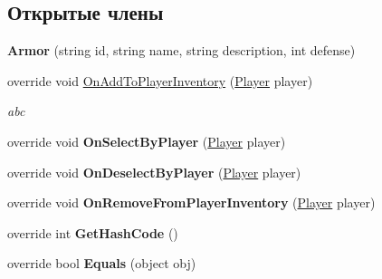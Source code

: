 \subsection*{Открытые члены}
\begin{DoxyCompactItemize}
\item 
\hypertarget{class_a_s_c_i_i_wars_1_1_game_1_1_armor_a3286b25da22682e4773667888ee99cf9}{}\label{class_a_s_c_i_i_wars_1_1_game_1_1_armor_a3286b25da22682e4773667888ee99cf9} 
{\bfseries Armor} (string id, string name, string description, int defense)
\item 
\hypertarget{class_a_s_c_i_i_wars_1_1_game_1_1_armor_ab8e1364e91ddd19f7c214f051b054cd8}{}\label{class_a_s_c_i_i_wars_1_1_game_1_1_armor_ab8e1364e91ddd19f7c214f051b054cd8} 
override void \hyperlink{class_a_s_c_i_i_wars_1_1_game_1_1_armor_ab8e1364e91ddd19f7c214f051b054cd8}{On\+Add\+To\+Player\+Inventory} (\hyperlink{class_a_s_c_i_i_wars_1_1_game_1_1_player}{Player} player)
\begin{DoxyCompactList}\small\item\em abc \end{DoxyCompactList}\item 
\hypertarget{class_a_s_c_i_i_wars_1_1_game_1_1_armor_ab4f8a39af009eef4bbdeb6db67fb9cd5}{}\label{class_a_s_c_i_i_wars_1_1_game_1_1_armor_ab4f8a39af009eef4bbdeb6db67fb9cd5} 
override void {\bfseries On\+Select\+By\+Player} (\hyperlink{class_a_s_c_i_i_wars_1_1_game_1_1_player}{Player} player)
\item 
\hypertarget{class_a_s_c_i_i_wars_1_1_game_1_1_armor_af502379d334f2fc7901638f8a8eba130}{}\label{class_a_s_c_i_i_wars_1_1_game_1_1_armor_af502379d334f2fc7901638f8a8eba130} 
override void {\bfseries On\+Deselect\+By\+Player} (\hyperlink{class_a_s_c_i_i_wars_1_1_game_1_1_player}{Player} player)
\item 
\hypertarget{class_a_s_c_i_i_wars_1_1_game_1_1_armor_ab113733825094b12aba14b8b48372f9c}{}\label{class_a_s_c_i_i_wars_1_1_game_1_1_armor_ab113733825094b12aba14b8b48372f9c} 
override void {\bfseries On\+Remove\+From\+Player\+Inventory} (\hyperlink{class_a_s_c_i_i_wars_1_1_game_1_1_player}{Player} player)
\item 
\hypertarget{class_a_s_c_i_i_wars_1_1_game_1_1_armor_a7abccb710e5f53baf59b4184140d907e}{}\label{class_a_s_c_i_i_wars_1_1_game_1_1_armor_a7abccb710e5f53baf59b4184140d907e} 
override int {\bfseries Get\+Hash\+Code} ()
\item 
\hypertarget{class_a_s_c_i_i_wars_1_1_game_1_1_armor_a2cb86fcb3169af675628bd2ab7e00036}{}\label{class_a_s_c_i_i_wars_1_1_game_1_1_armor_a2cb86fcb3169af675628bd2ab7e00036} 
override bool {\bfseries Equals} (object obj)
\end{DoxyCompactItemize}
